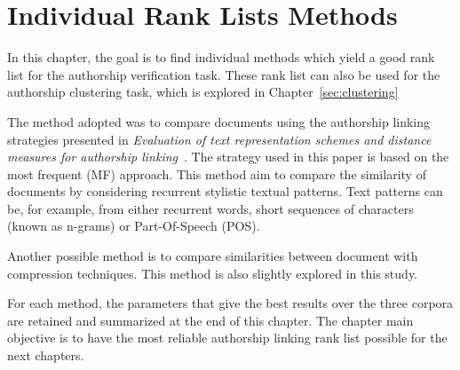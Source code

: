 \chapter{Individual Rank Lists Methods \label{sec:individual_methods}}

In this chapter, the goal is to find individual methods which yield a good rank list for the authorship verification task.
These rank list can also be used for the authorship clustering task, which is explored in Chapter~\ref{sec:clustering}

The method adopted was to compare documents using the authorship linking strategies presented in \textit{Evaluation of text representation schemes and distance measures for authorship linking}~\cite{kocher_verification}.
The strategy used in this paper is based on the most frequent (MF) approach.
This method aim to compare the similarity of documents by considering recurrent stylistic textual patterns.
Text patterns can be, for example, from either recurrent words, short sequences of characters (known as n-grams) or Part-Of-Speech (POS).

Another possible method is to compare similarities between document with compression techniques.
This method is also slightly explored in this study.

For each method, the parameters that give the best results over the three corpora are retained and summarized at the end of this chapter.
The chapter main objective is to have the most reliable authorship linking rank list possible for the next chapters.







